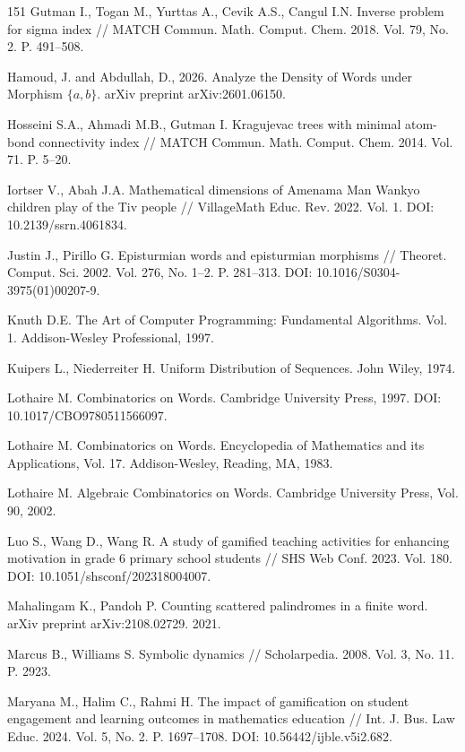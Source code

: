 \documentclass[a4paper,14pt]{extreport}
\theoremstyle{plain}
\theoremstyle{definition}
\theoremstyle{remark}
\begin{document}
\begin{thebibliography}{151}
		Gutman I., Togan M., Yurttas A., Cevik A.S., Cangul I.N. Inverse problem for sigma index // MATCH Commun. Math. Comput. Chem. 2018. Vol. 79, No. 2. P. 491--508.
		
		Hamoud, J. and Abdullah, D., 2026. Analyze the Density of Words under Morphism $\{a, b\} $. arXiv preprint arXiv:2601.06150.
		
		Hosseini S.A., Ahmadi M.B., Gutman I. Kragujevac trees with minimal atom-bond connectivity index // MATCH Commun. Math. Comput. Chem. 2014. Vol. 71. P. 5--20.
		
		Iortser V., Abah J.A. Mathematical dimensions of Amenama Man Wankyo children play of the Tiv people // VillageMath Educ. Rev. 2022. Vol. 1. DOI: 10.2139/ssrn.4061834.
		
		Justin J., Pirillo G. Episturmian words and episturmian morphisms // Theoret. Comput. Sci. 2002. Vol. 276, No. 1--2. P. 281--313. DOI: 10.1016/S0304-3975(01)00207-9.
		
		Knuth D.E. The Art of Computer Programming: Fundamental Algorithms. Vol. 1. Addison-Wesley Professional, 1997.
		
		Kuipers L., Niederreiter H. Uniform Distribution of Sequences. John Wiley, 1974.
		
		Lothaire M. Combinatorics on Words. Cambridge University Press, 1997. DOI: 10.1017/CBO9780511566097.
		
		Lothaire M. Combinatorics on Words. Encyclopedia of Mathematics and its Applications, Vol. 17. Addison-Wesley, Reading, MA, 1983.
		
		Lothaire M. Algebraic Combinatorics on Words. Cambridge University Press, Vol. 90, 2002.
		
		Luo S., Wang D., Wang R. A study of gamified teaching activities for enhancing motivation in grade 6 primary school students // SHS Web Conf. 2023. Vol. 180. DOI: 10.1051/shsconf/202318004007.
		
		Mahalingam K., Pandoh P. Counting scattered palindromes in a finite word. arXiv preprint arXiv:2108.02729. 2021.
		
		Marcus B., Williams S. Symbolic dynamics // Scholarpedia. 2008. Vol. 3, No. 11. P. 2923.
		
		Maryana M., Halim C., Rahmi H. The impact of gamification on student engagement and learning outcomes in mathematics education // Int. J. Bus. Law Educ. 2024. Vol. 5, No. 2. P. 1697--1708. DOI: 10.56442/ijble.v5i2.682.
		

\end{thebibliography}
\end{document}
